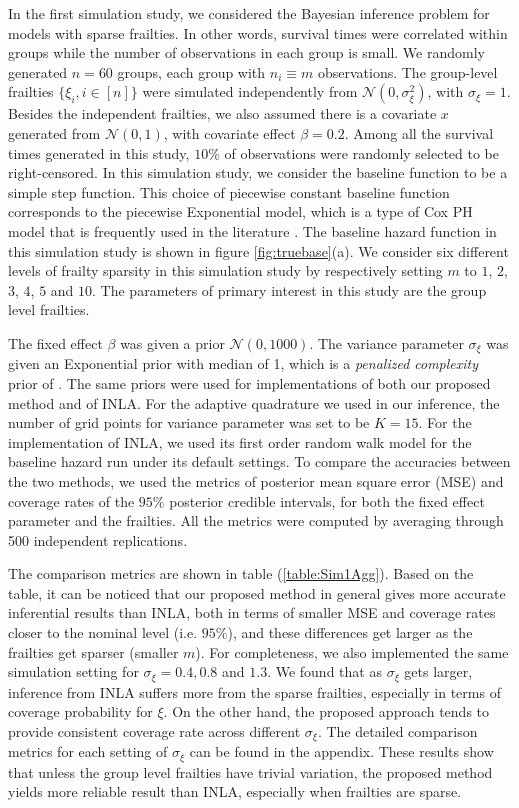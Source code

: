 \documentclass[ba]{imsart}
\begin{document}
In the first simulation study, we considered the Bayesian inference problem for models with sparse frailties. In other words, survival times were correlated within groups while the number of observations in each group is small. We randomly generated $n = 60$ groups, each group with $n_i \equiv m$ observations. The group-level frailties $\{\xi_i, i\in [n] \}$ were simulated independently from $\mathcal{N}(0,\sigma_\xi^{2})$, with $\sigma_{\xi} = 1$. Besides the independent frailties, we also assumed there is a covariate $x$ generated from $\mathcal{N}(0,1)$, with covariate effect $\beta = 0.2$. Among all the survival times generated in this study, $10\%$ of observations were randomly selected to be right-censored. In this simulation study, we consider the baseline function to be a simple step function. This choice of piecewise constant baseline function corresponds to the piecewise Exponential model, which is a type of Cox PH model that is frequently used in the literature \citep{piecewiseExp}.
The baseline hazard function in this simulation study is shown in figure \ref{fig:truebase}(a). We consider six different levels of frailty sparsity in this simulation study by respectively setting $m$ to $1$, $2$, $3$, $4$, $5$ and $10$. The parameters of primary interest in this study are the group level frailties.

The fixed effect $\beta$ was given a prior $\mathcal{N}(0,1000)$. The variance parameter $\sigma_\xi$ was given an Exponential prior with median of 1, which is a \emph{penalized complexity} prior of \cite{pcprior}. The same priors were used for implementations of both our proposed method and of INLA. For the adaptive quadrature we used in our inference, the number of grid points for variance parameter was set to be $K = 15$. For the implementation of INLA, we used its first order random walk model for the baseline hazard run under its default settings. To compare the accuracies between the two methods, we used the metrics of posterior mean square error (MSE) and coverage rates of the $95\%$ posterior credible intervals, for both the fixed effect parameter and the frailties. All the metrics were computed by averaging through 500 independent replications.

The comparison metrics are shown in table (\ref{table:Sim1Agg}). Based on the table, it can be noticed that our proposed method in general gives more accurate inferential results than INLA, both in terms of smaller MSE and coverage rates closer to the nominal level (i.e. $95\%$), and these differences get larger as the frailties get sparser (smaller $m$). 
For completeness, we also implemented the same simulation setting for $\sigma_\xi = 0.4, 0.8$ and $1.3$. We found that as $\sigma_\xi$ gets larger, inference from INLA suffers more from the sparse frailties, especially in terms of coverage probability for $\xi$. On the other hand, the proposed approach tends to provide consistent coverage rate across different $\sigma_\xi$. The detailed comparison metrics for each setting of $\sigma_\xi$ can be found in the appendix. These results show that unless the group level frailties have trivial variation, the proposed method yields more reliable result than INLA, especially when frailties are sparse.
\end{document}
